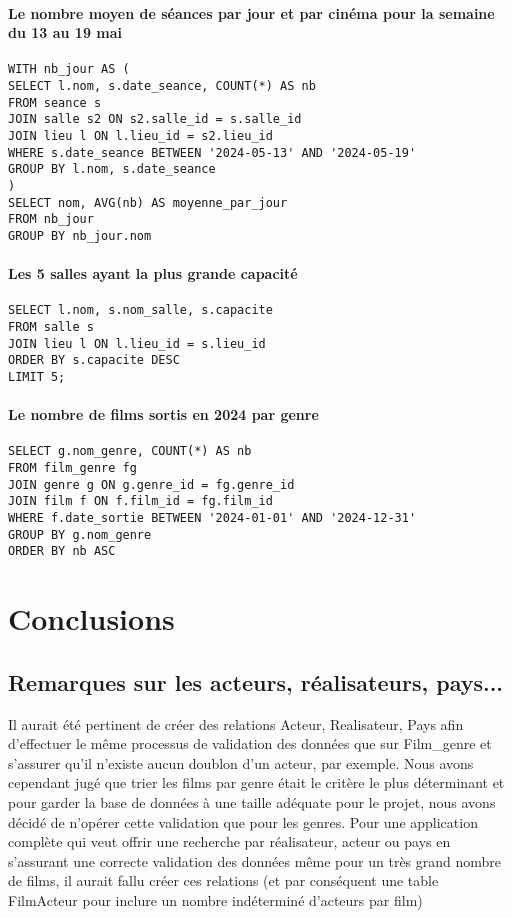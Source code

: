 \documentclass[12pt]{article}
\begin{document}
\paragraph*{Le nombre moyen de séances par jour et par cinéma pour la semaine du 13 au 19 mai}
\begin{verbatim}
WITH nb_jour AS ( 
SELECT l.nom, s.date_seance, COUNT(*) AS nb 
FROM seance s  
JOIN salle s2 ON s2.salle_id = s.salle_id 
JOIN lieu l ON l.lieu_id = s2.lieu_id 
WHERE s.date_seance BETWEEN '2024-05-13' AND '2024-05-19' 
GROUP BY l.nom, s.date_seance  
) 
SELECT nom, AVG(nb) AS moyenne_par_jour 
FROM nb_jour 
GROUP BY nb_jour.nom
\end{verbatim}
\paragraph*{Les 5 salles ayant la plus grande capacité}
\begin{verbatim}
SELECT l.nom, s.nom_salle, s.capacite  
FROM salle s  
JOIN lieu l ON l.lieu_id = s.lieu_id  
ORDER BY s.capacite DESC 
LIMIT 5; 
\end{verbatim}
\paragraph*{Le nombre de films sortis en 2024 par genre}
\begin{verbatim}
SELECT g.nom_genre, COUNT(*) AS nb 
FROM film_genre fg  
JOIN genre g ON g.genre_id = fg.genre_id  
JOIN film f ON f.film_id = fg.film_id  
WHERE f.date_sortie BETWEEN '2024-01-01' AND '2024-12-31' 
GROUP BY g.nom_genre 
ORDER BY nb ASC 
\end{verbatim}
\pagebreak
\section{Conclusions}
\subsection{Remarques sur les acteurs, réalisateurs, pays...}
Il aurait été pertinent de créer des relations Acteur, Realisateur, Pays afin d'effectuer le même
processus de validation des données que sur Film{\_}genre et s'assurer qu'il n'existe aucun doublon d'un acteur, par exemple. 
Nous avons cependant jugé que trier les films par genre était le critère le plus déterminant et pour garder la base de données
à une taille adéquate pour le projet, nous avons décidé de n'opérer cette validation que pour les genres. Pour une application
complète qui veut offrir une recherche par réalisateur, acteur ou pays en s'assurant une correcte validation des données même pour un très
grand nombre de films, il aurait fallu créer ces relations (et par conséquent une table FilmActeur pour inclure un nombre
indéterminé d'acteurs par film)
\end{document}
